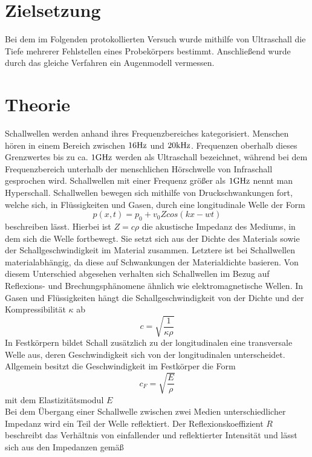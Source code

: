 \section{Zielsetzung}
Bei dem im Folgenden protokollierten Versuch wurde mithilfe von Ultraschall die Tiefe mehrerer Fehlstellen eines Probekörpers bestimmt. Anschließend wurde durch das gleiche Verfahren ein Augenmodell vermessen. 
\section{Theorie}
\label{sec:theorie}
Schallwellen werden anhand ihres Frequenzbereiches kategorisiert. Menschen hören in einem Bereich zwischen 
$16\si[]{Hz}$ und $20 \si[]{kHz}$. Frequenzen oberhalb dieses Grenzwertes bis zu ca. $1 \si[]{GHz}$ werden als Ultraschall 
bezeichnet, während bei dem Frequenzbereich unterhalb der menschlichen Hörschwelle von Infraschall gesprochen 
wird. Schallwellen mit einer Frequenz größer als $1 \si[]{GHz}$ nennt man Hyperschall.  
Schallwellen bewegen sich mithilfe von Druckschwankungen fort, welche sich, in Flüssigkeiten und 
Gasen, durch eine longitudinale Welle der Form
\begin{equation}
p(x,t)=p_0+v_0Zcos(kx-wt)
\end{equation}
beschreiben lässt. Hierbei ist $Z=c\rho$ die akustische Impedanz des Mediums, in dem sich die Welle fortbewegt. Sie setzt sich aus der Dichte des Materials sowie der Schallgeschwindigkeit im Material zusammen. Letztere ist bei Schallwellen materialabhängig, da diese auf Schwankungen der Materialdichte basieren. Von diesem Unterschied abgesehen verhalten sich Schallwellen im Bezug auf Reflexions- und Brechungsphänomene ähnlich wie elektromagnetische Wellen. 
In Gasen und Flüssigkeiten hängt die Schallgeschwindigkeit von der Dichte und der Kompressibilität $\kappa$ ab
\begin{equation}
c=\sqrt{\frac{1}{\kappa \rho}}
\end{equation}
In Festkörpern bildet Schall zusätzlich zu der longitudinalen eine transversale Welle aus, deren Geschwindigkeit sich von der longitudinalen unterscheidet. Allgemein besitzt die Geschwindigkeit im Festkörper die Form
\begin{equation}
c_F=\sqrt{\frac{E}{\rho}}
\end{equation}
mit dem Elastizitätsmodul $E$ \\
Bei dem Übergang einer Schallwelle zwischen zwei Medien unterschiedlicher Impedanz wird ein Teil der Welle reflektiert. Der Reflexionskoeffizient $R$ beschreibt das Verhältnis von einfallender und reflektierter Intensität und lässt sich aus den Impedanzen gemäß
